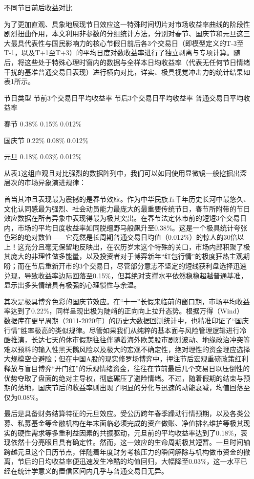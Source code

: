 \documentclass{cupb-thesis}
\begin{document}
不同节日前后收益对比

为了更加直观、具象地展现节日效应这一特殊时间切片对市场收益率曲线的阶段性剧烈扭曲作用，本文利用非参数的分组统计方法，分别对春节、国庆节和元旦这三大最具代表性与国民影响力的核心节假日前后各3个交易日（即模型定义的T-3至T-1，以及T+1至T+3）的平均日度对数收益率进行了独立剥离与专项计算。随后，将这些处于特殊心理时窗内的数据与全样本日均收益率（代表无任何节日情绪干扰的基准普通交易日表现）进行横向对比，详实、极具视觉冲击力的统计结果如表1所示。


节日类型	节前3个交易日平均收益率	节后3个交易日平均收益率	普通交易日平均收益率

春节	0.38\%	0.15\%	0.012\%

国庆节	0.22\%	0.08\%	0.012\%

元旦	0.18\%	0.03\%	0.012\%

从表1这组直观且对比强烈的数据阵列中，我们可以如同使用显微镜一般挖掘出深层次的市场异象演进规律：


首当其冲且表现最为震撼的是春节效应。作为中华民族五千年历史长河中最悠久、文化认同感最为强烈、社会动员能力最庞大的最重要传统节日，春节所附带的节日效应数据在所有异象中表现得最为极其突出。在春节法定休市前的短短3个交易日内，市场的平均日度收益率如同脱缰野马般飙升至0.38\%。这是一个极具统计夸张色彩的绝对数值——它竟然是长周期普通交易日均值（0.012\%）的惊人的30倍以上！这充分且毫无保留地反映出，在农历岁末这个特殊的关口，市场内部积聚了极其庞大的非理性做多能量，以及投资者对于博弈新年“红包行情”的极度狂热主观期盼；而在节后重新开市的3个交易日，尽管部分意志不坚定的短线获利盘选择迅速兑现，导致收益率边际回落至0.15\%，但其绝对支撑水平依然稳稳超越普通基准，显示出多头情绪具有极强的心理惯性与余温。


其次是极具博弈色彩的国庆节效应。在“十一”长假来临前的窗口期，市场平均收益率达到了0.22\%，同样呈现出极为陡峭的正向向上拉升态势。根据万得（Wind）数据库在更早周期（2011-2020年）的历史大数据回测统计中，也精准印证了“国庆行情”胜率极高的类似规律。尽管如果我们从纯粹的基本面与风险管理逻辑进行冷酷推演，长达七天的休市假期往往伴随着海外欧美股市剧烈波动、地缘政治冲突等难以预料的输入性黑天鹅风险以及极大的宏观不确定性，绝对理性的资金理应选择大规模空仓避险；但在中国A股的现实修罗场博弈中，押注节后宏观重磅政策红利释放与盲目博弈“开门红”的乐观情绪资金，往往在节前最后几个交易日以压倒性的优势夺取了盘面的绝对主导权，彻底碾压了避险情绪。不过，随着假期的结束与预期的落地，国庆节后的收益率则出现了明显的分化与迅速的动能衰减，均值回落至仅为0.08\%。


最后是具备财务结算特征的元旦效应。受公历跨年春季躁动行情预期，以及各类公募、私募基金等金融机构在年末面临必须完成的资产做账、净值排名维护等极其现实的硬性需求等多重利益因素的共振驱动，元旦前的平均收益率达到了0.18\%，表现依然十分亮眼且具有确定性。然而，这一效应的生命周期极其短暂。一旦时间轴跨越元旦这个日历节点，伴随着年度财务考核压力的瞬间解除与机构做市资金的撤离，节后的日均收益率便迅速发生冷酷的均值回归，大幅降至0.03\%，这一水平已经在统计学意义的置信区间内几乎与普通交易日无异。
\end{document}
